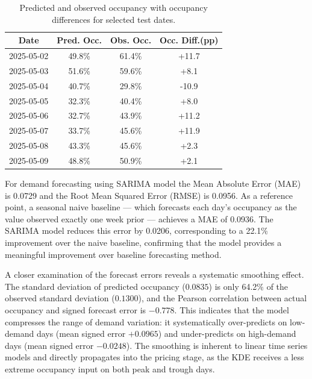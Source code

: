 \begin{table}[ht]
    \centering
    \small
    \begin{tabular}{|c|c|c|c|}
        \hline
        Date       & Pred. Occ. & Obs. Occ. & Occ. Diff.(pp) \\
        \hline
        2025-05-02 & 49.8\%     & 61.4\%    & +11.7          \\
        2025-05-03 & 51.6\%     & 59.6\%    & +8.1           \\
        2025-05-04 & 40.7\%     & 29.8\%    & -10.9          \\
        2025-05-05 & 32.3\%     & 40.4\%    & +8.0           \\
        2025-05-06 & 32.7\%     & 43.9\%    & +11.2          \\
        2025-05-07 & 33.7\%     & 45.6\%    & +11.9          \\
        2025-05-08 & 43.3\%     & 45.6\%    & +2.3           \\
        2025-05-09 & 48.8\%     & 50.9\%    & +2.1           \\
        \hline
    \end{tabular}
    \caption{Predicted and observed occupancy with occupancy differences for selected test dates.}
    \label{tab:generated_occupancy_recommendations}
\end{table}

\medskip
For demand forecasting using SARIMA model the Mean Absolute Error (MAE) is 0.0729 and the Root Mean Squared Error (RMSE) is 0.0956. As a reference point, a seasonal naive baseline — which forecasts each day's occupancy as the value observed exactly one week prior — achieves a MAE of 0.0936. The SARIMA model reduces this error by 0.0206, corresponding to a 22.1\% improvement over the naive baseline, confirming that the model provides a meaningful improvement over baseline forecasting method.

A closer examination of the forecast errors reveals a systematic smoothing effect. The standard deviation of predicted occupancy ($0.0835$) is only 64.2\% of the observed standard deviation ($0.1300$), and the Pearson correlation between actual occupancy and signed forecast error is $-0.778$. This indicates that the model compresses the range of demand variation: it systematically over-predicts on low-demand days (mean signed error $+0.0965$) and under-predicts on high-demand days (mean signed error $-0.0248$). The smoothing is inherent to linear time series models and directly propagates into the pricing stage, as the KDE receives a less extreme occupancy input on both peak and trough days.

